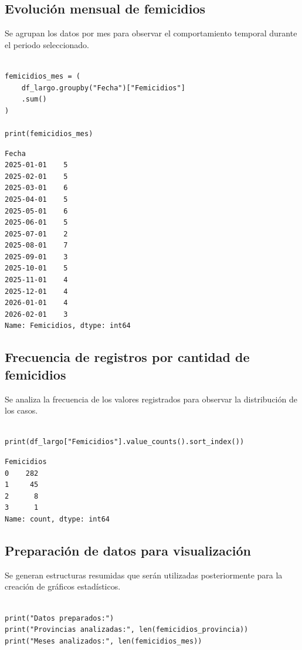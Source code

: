 \documentclass[11pt]{article}
\begin{document}
\subsection{Evolución mensual de femicidios}
\label{sec:org7c24b5e}

Se agrupan los datos por mes para observar el comportamiento temporal
durante el periodo seleccionado.


\begin{verbatim}

femicidios_mes = (
    df_largo.groupby("Fecha")["Femicidios"]
    .sum()
)

print(femicidios_mes)

\end{verbatim}

\begin{verbatim}
Fecha
2025-01-01    5
2025-02-01    5
2025-03-01    6
2025-04-01    5
2025-05-01    6
2025-06-01    5
2025-07-01    2
2025-08-01    7
2025-09-01    3
2025-10-01    5
2025-11-01    4
2025-12-01    4
2026-01-01    4
2026-02-01    3
Name: Femicidios, dtype: int64
\end{verbatim}

\subsection{Frecuencia de registros por cantidad de femicidios}
\label{sec:org6365328}

Se analiza la frecuencia de los valores registrados para observar la
distribución de los casos.

\begin{verbatim}

print(df_largo["Femicidios"].value_counts().sort_index())

\end{verbatim}

\begin{verbatim}
Femicidios
0    282
1     45
2      8
3      1
Name: count, dtype: int64
\end{verbatim}


\subsection{Preparación de datos para visualización}
\label{sec:orgd473785}

Se generan estructuras resumidas que serán utilizadas posteriormente
para la creación de gráficos estadísticos.

\begin{verbatim}

print("Datos preparados:")
print("Provincias analizadas:", len(femicidios_provincia))
print("Meses analizados:", len(femicidios_mes))

\end{verbatim}
\end{document}
